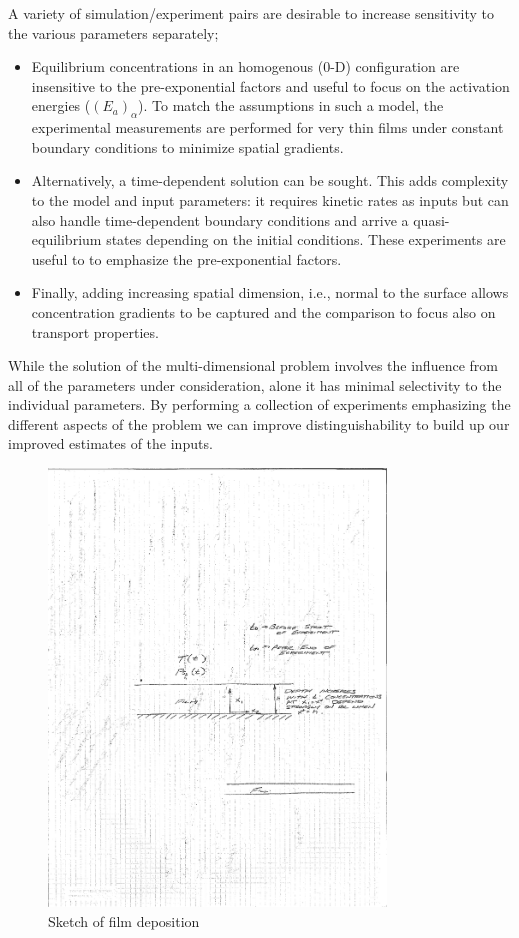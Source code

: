 \documentclass[11pt]{article}
\begin{document}
A variety of simulation/experiment pairs are desirable to increase
sensitivity to the various parameters separately; 


\begin{itemize}
\item Equilibrium concentrations in an homogenous (0-D) configuration
  are insensitive to the pre-exponential factors and useful to focus
  on the activation energies ($(E_a)_\alpha$). To match the
  assumptions in such a model, the experimental measurements are
  performed for very thin films under constant boundary conditions to
  minimize spatial gradients. 
\item Alternatively, a time-dependent solution can be sought. This
  adds complexity to the model and input parameters: it requires
  kinetic rates as inputs but can also handle time-dependent boundary
  conditions and arrive a quasi-equilibrium states depending on the
  initial conditions. These experiments are useful to to emphasize the
  pre-exponential factors.
\item Finally, adding increasing spatial dimension, i.e., normal to
  the surface allows concentration gradients to be captured and the
  comparison to focus also on transport properties. 
\end{itemize}

While the solution of the multi-dimensional problem involves the
influence from all of the parameters under consideration, alone it has
minimal selectivity to the individual parameters. By performing a
collection of experiments emphasizing the different aspects of the
problem we can improve distinguishability to build up our improved
estimates of the inputs. 

\begin{figure}[h]
  \centering
  \includegraphics[width=0.8\textwidth]{pd_sketch.pdf}
  \caption{Sketch of film deposition}
  \label{fig:film}
\end{figure}
\end{document}
